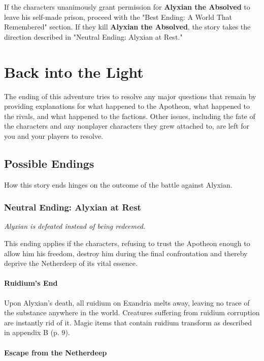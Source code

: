 \documentclass[letterpaper, 11pt, bg=full, twocolumn]{dndbook}
\begin{document}
If the characters unanimously grant permission for \textbf{Alyxian the Absolved} to leave his self-made prison, proceed with the "Best Ending: A World That Remembered" section. If they kill \textbf{Alyxian the Absolved}, the story takes the direction described in "Neutral Ending: Alyxian at Rest."

\section{Back into the Light}

The ending of this adventure tries to resolve any major questions that remain by providing explanations for what happened to the Apotheon, what happened to the rivals, and what happened to the factions. Other issues, including the fate of the characters and any nonplayer characters they grew attached to, are left for you and your players to resolve.

\subsection{Possible Endings}

How this story ends hinges on the outcome of the battle against Alyxian.

\subsubsection{Neutral Ending: Alyxian at Rest}

\textit{Alyxian is defeated instead of being redeemed.}

This ending applies if the characters, refusing to trust the Apotheon enough to allow him his freedom, destroy him during the final confrontation and thereby deprive the Netherdeep of its vital essence.

\paragraph{Ruidium's End}

Upon Alyxian's death, all ruidium on Exandria melts away, leaving no trace of the substance anywhere in the world. Creatures suffering from ruidium corruption are instantly rid of it. Magic items that contain ruidium transform as described in appendix B (p. 9).

\paragraph{Escape from the Netherdeep}
\end{document}
